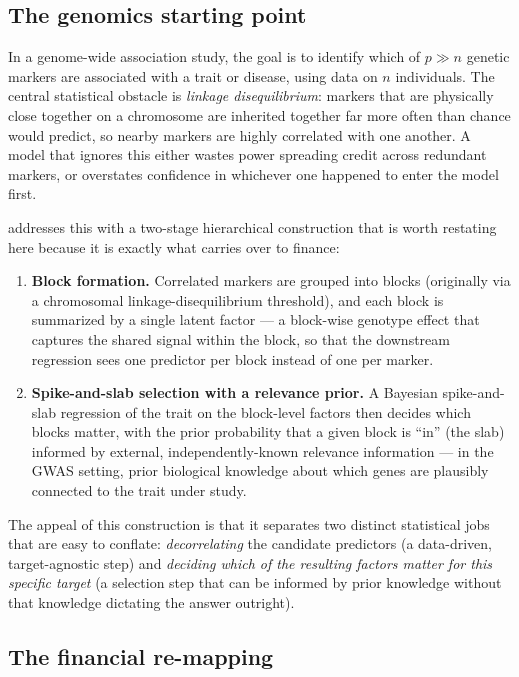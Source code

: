 \documentclass[11pt]{article}
\begin{document}
\subsection{The genomics starting point}

In a genome-wide association study, the goal is to identify which of
$p \gg n$ genetic markers are associated with a trait or disease, using data
on $n$ individuals. The central statistical obstacle is \emph{linkage
disequilibrium}: markers that are physically close together on a chromosome
are inherited together far more often than chance would predict, so nearby
markers are highly correlated with one another. A model that ignores this
either wastes power spreading credit across redundant markers, or overstates
confidence in whichever one happened to enter the model first.

\citet{johnston2015} addresses this with a two-stage hierarchical construction
that is worth restating here because it is exactly what carries over to
finance:
\begin{enumerate}[leftmargin=1.4em]
  \item \textbf{Block formation.} Correlated markers are grouped into blocks
  (originally via a chromosomal linkage-disequilibrium threshold), and each
  block is summarized by a single latent factor --- a block-wise genotype
  effect that captures the shared signal within the block, so that the
  downstream regression sees one predictor per block instead of one per
  marker.
  \item \textbf{Spike-and-slab selection with a relevance prior.} A Bayesian
  spike-and-slab regression of the trait on the block-level factors then
  decides which blocks matter, with the prior probability that a given block
  is ``in'' (the slab) informed by external, independently-known relevance
  information --- in the GWAS setting, prior biological knowledge about which
  genes are plausibly connected to the trait under study.
\end{enumerate}
The appeal of this construction is that it separates two distinct statistical
jobs that are easy to conflate: \emph{decorrelating} the candidate predictors
(a data-driven, target-agnostic step) and \emph{deciding which of the
resulting factors matter for this specific target} (a selection step that can
be informed by prior knowledge without that knowledge dictating the answer
outright).

\subsection{The financial re-mapping}
\label{sec:remapping}
\end{document}
